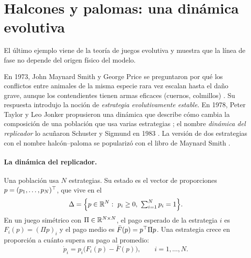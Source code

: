 \section{Halcones y palomas: una dinámica evolutiva}
\label{sec:un-halcon}

El último ejemplo viene de la teoría de juegos evolutiva y muestra que la línea de fase no depende del origen físico del modelo.

\begin{historia}
En 1973, John Maynard Smith y George Price se preguntaron por qué los conflictos entre animales de la misma especie rara vez escalan hasta el daño grave, aunque los contendientes tienen armas eficaces (cuernos, colmillos) \citep{MSPr73}. Su respuesta introdujo la noción de \emph{estrategia evolutivamente estable}. En 1978, Peter Taylor y Leo Jonker propusieron una dinámica que describe cómo cambia la composición de una población que usa varias estrategias \citep{TaJo78}; el nombre \emph{dinámica del replicador} lo acuñaron Schuster y Sigmund en 1983 \citep{ScSi83}. La versión de dos estrategias con el nombre halcón--paloma se popularizó con el libro de Maynard Smith \citep{MS82}.
\end{historia}

\paragraph{La dinámica del replicador.} Una población usa $N$ estrategias. Su estado es el vector de proporciones $p=(p_1,\dots,p_N)^{\top}$, que vive en el 
\[
  \simplex=\Bigl\{p\in\R^N:\ p_i\ge0,\ \textstyle\sum_{i=1}^Np_i=1\Bigr\}.
\]
En un juego simétrico con  $\Pi\in\mathbb{R}^{N\times N}$, el pago esperado de la estrategia $i$ es $F_i(p)=(\Pi p)_i$ y el pago medio es $\bar F(p)=p^{\top}\Pi p$. Una estrategia crece en proporción a cuánto supera su pago al promedio:
\begin{equation}
  \dot p_i=p_i\bigl(F_i(p)-\bar F(p)\bigr),\qquad i=1,\dots,N .
  \label{eq:un-replicador}
\end{equation}

